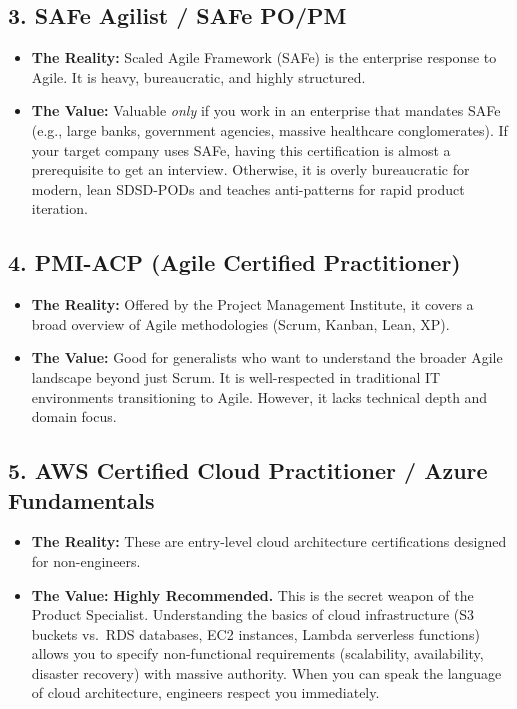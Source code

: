 \subsection{3. SAFe Agilist / SAFe PO/PM}\label{safe-agilist-safe-popm}

\begin{itemize}
\tightlist
\item
  \textbf{The Reality:} Scaled Agile Framework (SAFe) is the enterprise
  response to Agile. It is heavy, bureaucratic, and highly structured.
\item
  \textbf{The Value:} Valuable \emph{only} if you work in an enterprise
  that mandates SAFe (e.g., large banks, government agencies, massive
  healthcare conglomerates). If your target company uses SAFe, having
  this certification is almost a prerequisite to get an interview.
  Otherwise, it is overly bureaucratic for modern, lean SDSD-PODs and
  teaches anti-patterns for rapid product iteration.
\end{itemize}

\subsection{4. PMI-ACP (Agile Certified
Practitioner)}\label{pmi-acp-agile-certified-practitioner}

\begin{itemize}
\tightlist
\item
  \textbf{The Reality:} Offered by the Project Management Institute, it
  covers a broad overview of Agile methodologies (Scrum, Kanban, Lean,
  XP).
\item
  \textbf{The Value:} Good for generalists who want to understand the
  broader Agile landscape beyond just Scrum. It is well-respected in
  traditional IT environments transitioning to Agile. However, it lacks
  technical depth and domain focus.
\end{itemize}

\subsection{5. AWS Certified Cloud Practitioner / Azure
Fundamentals}\label{aws-certified-cloud-practitioner-azure-fundamentals}

\begin{itemize}
\tightlist
\item
  \textbf{The Reality:} These are entry-level cloud architecture
  certifications designed for non-engineers.
\item
  \textbf{The Value:} \textbf{Highly Recommended.} This is the secret
  weapon of the Product Specialist. Understanding the basics of cloud
  infrastructure (S3 buckets vs.~RDS databases, EC2 instances, Lambda
  serverless functions) allows you to specify non-functional
  requirements (scalability, availability, disaster recovery) with
  massive authority. When you can speak the language of cloud
  architecture, engineers respect you immediately.
\end{itemize}


